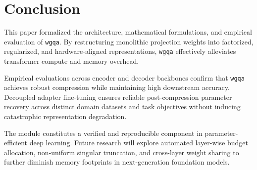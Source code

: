 \section{Conclusion}
This paper formalized the architecture, mathematical formulations, and empirical evaluation of \texttt{wgqa}. By restructuring monolithic projection weights into factorized, regularized, and hardware-aligned representations, \texttt{wgqa} effectively alleviates transformer compute and memory overhead.

Empirical evaluations across encoder and decoder backbones confirm that \texttt{wgqa} achieves robust compression while maintaining high downstream accuracy. Decoupled adapter fine-tuning ensures reliable post-compression parameter recovery across distinct domain datasets and task objectives without inducing catastrophic representation degradation.

The module constitutes a verified and reproducible component in parameter-efficient deep learning. Future research will explore automated layer-wise budget allocation, non-uniform singular truncation, and cross-layer weight sharing to further diminish memory footprints in next-generation foundation models.
